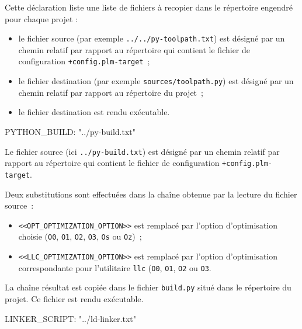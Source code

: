 Cette déclaration liste une liste de fichiers à recopier dans le répertoire engendré pour chaque projet :
\begin{itemize}
  \item le fichier source (par exemple \texttt{../../py-toolpath.txt}) est désigné par un chemin relatif par rapport au répertoire qui contient le fichier de configuration \texttt{+config.plm-target}~;
  \item le fichier destination (par exemple \texttt{sources/toolpath.py}) est désigné par un chemin relatif par rapport au répertoire du projet~;
  \item le fichier destination est rendu exécutable.
\end{itemize}






\begin{PLM}
PYTHON_BUILD:
   "../py-build.txt"
\end{PLM}

Le fichier source (ici \texttt{../py-build.txt}) est désigné par un chemin relatif par rapport au répertoire qui contient le fichier de configuration \texttt{+config.plm-target}.

Deux substitutions sont effectuées dans la chaîne obtenue par la lecture du fichier source~:
\begin{itemize}
  \item \texttt{<<OPT\_OPTIMIZATION\_OPTION>>} est remplacé par l'option d'optimisation choisie (\texttt{O0}, \texttt{O1}, \texttt{O2}, \texttt{O3}, \texttt{Os} ou \texttt{Oz})~;
  \item \texttt{<<LLC\_OPTIMIZATION\_OPTION>>} est remplacé par l'option d'optimisation correspondante pour l'utilitaire \texttt{llc} (\texttt{O0}, \texttt{O1}, \texttt{O2} ou \texttt{O3}.
\end{itemize}


La chaîne résultat est copiée dans le fichier \texttt{build.py} situé dans le répertoire du projet. Ce fichier est rendu exécutable.










\begin{PLM}
LINKER_SCRIPT:
  "../ld-linker.txt"
\end{PLM}

